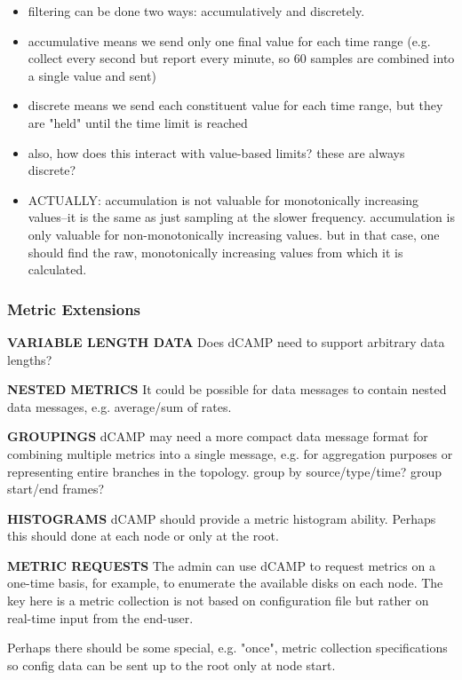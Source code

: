 \begin{itemize}
\item filtering can be done two ways: accumulatively and discretely.
\item accumulative means we send only one final value for each time range (e.g. collect every second but report every
      minute, so 60 samples are combined into a single value and sent)
\item discrete means we send each constituent value for each time range, but they are "held" until the time limit is
      reached
\item also, how does this interact with value-based limits? these are always discrete?
\item ACTUALLY: accumulation is not valuable for monotonically increasing values--it is the same as just sampling at the
      slower frequency. accumulation is only valuable for non-monotonically increasing values. but in that case, one
      should find the raw, monotonically increasing values from which it is calculated.
\end{itemize}

\subsubsection{Metric Extensions}

\textbf{VARIABLE LENGTH DATA}
Does dCAMP need to support arbitrary data lengths?

\textbf{NESTED METRICS}
It could be possible for data messages to contain nested data messages, e.g. average/sum of rates.

\textbf{GROUPINGS}
dCAMP may need a more compact data message format for combining multiple metrics into a single message, e.g. for
aggregation purposes or representing entire branches in the topology.
group by source/type/time?
group start/end frames?

\textbf{HISTOGRAMS}
dCAMP should provide a metric histogram ability. Perhaps this should done at each node or only at the root.

\textbf{METRIC REQUESTS}
The admin can use dCAMP to request metrics on a one-time basis, for example, to enumerate the available disks on each
node. The key here is a metric collection is not based on configuration file but rather on real-time input from the
end-user.

Perhaps there should be some special, e.g. "once", metric collection specifications so config data can be sent up to the
root only at node start.


